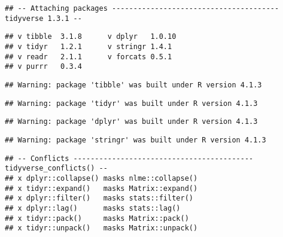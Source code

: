 \documentclass[
]{book}
\begin{document}
\begin{verbatim}
## -- Attaching packages --------------------------------------- tidyverse 1.3.1 --
\end{verbatim}

\begin{verbatim}
## v tibble  3.1.8      v dplyr   1.0.10
## v tidyr   1.2.1      v stringr 1.4.1 
## v readr   2.1.1      v forcats 0.5.1 
## v purrr   0.3.4
\end{verbatim}

\begin{verbatim}
## Warning: package 'tibble' was built under R version 4.1.3
\end{verbatim}

\begin{verbatim}
## Warning: package 'tidyr' was built under R version 4.1.3
\end{verbatim}

\begin{verbatim}
## Warning: package 'dplyr' was built under R version 4.1.3
\end{verbatim}

\begin{verbatim}
## Warning: package 'stringr' was built under R version 4.1.3
\end{verbatim}

\begin{verbatim}
## -- Conflicts ------------------------------------------ tidyverse_conflicts() --
## x dplyr::collapse() masks nlme::collapse()
## x tidyr::expand()   masks Matrix::expand()
## x dplyr::filter()   masks stats::filter()
## x dplyr::lag()      masks stats::lag()
## x tidyr::pack()     masks Matrix::pack()
## x tidyr::unpack()   masks Matrix::unpack()
\end{verbatim}
\end{document}

